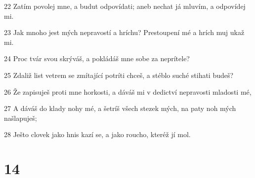 \par 22 Zatím povolej mne, a budut odpovídati; aneb nechat já mluvím, a odpovídej mi.
\par 23 Jak mnoho jest mých nepravostí a hríchu? Prestoupení mé a hrích muj ukaž mi.
\par 24 Proc tvár svou skrýváš, a pokládáš mne sobe za neprítele?
\par 25 Zdaliž list vetrem se zmítající potríti chceš, a stéblo suché stihati budeš?
\par 26 Že zapisuješ proti mne horkosti, a dáváš mi v dedictví nepravosti mladosti mé,
\par 27 A dáváš do klady nohy mé, a šetríš všech stezek mých, na paty noh mých našlapuješ;
\par 28 Ješto clovek jako hnis kazí se, a jako roucho, kteréž jí mol.

\chapter{14}

